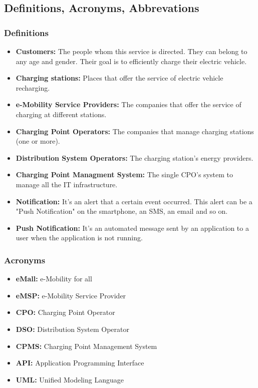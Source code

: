 \subsection{Definitions, Acronyms, Abbrevations}
\subsubsection{Definitions}
\begin{itemize}
        \item \textbf{Customers:} The people whom this service is directed. 
        They can belong to any age and gender. \label{Customer}
        Their goal is to efficiently charge their electric vehicle.        
        \item \textbf{Charging stations:} Places that offer the service of electric vehicle recharging.
        \item \textbf{e-Mobility Service Providers:} The companies that offer the service of charging at different stations.
        \item \textbf{Charging Point Operators:} The companies that manage charging stations (one or more).\label{CPO}
        \item \textbf{Distribution System Operators:} The charging station's energy providers.\label{DSO}
        \item \textbf{Charging Point Managment System:} The single CPO's system to manage all the IT infrastructure.
        \item \textbf{Notification:} It's an alert that a certain event occurred. 
        This alert can be a "Push Notification" on the smartphone, an SMS, an email and so on.
        \item \textbf{Push Notification:} It's an automated message sent by an application to a user when the application is not running.
\end{itemize}
\subsubsection{Acronyms}
\begin{itemize}
        \item \textbf{eMall:} e-Mobility for all
        \item \textbf{eMSP:} e-Mobility Service Provider
        \item \textbf{CPO:} Charging Point Operator
        \item \textbf{DSO:} Distribution System Operator
        \item \textbf{CPMS:} Charging Point Management System
        \item \textbf{API:} Application Programming Interface
        \item \textbf{UML:} Unified Modeling Language
\end{itemize}
